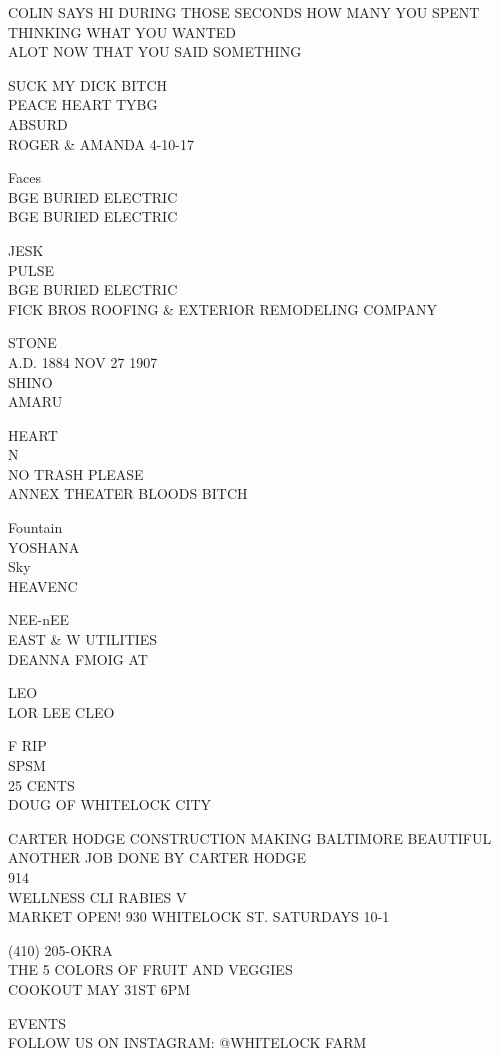 \documentclass[10pt,letterpaper]{article}
\begin{document}
COLIN SAYS HI DURING THOSE SECONDS HOW MANY YOU SPENT THINKING WHAT YOU WANTED\\
ALOT NOW THAT YOU SAID SOMETHING

SUCK MY DICK BITCH\\
PEACE HEART TYBG\\
ABSURD\\
ROGER \& AMANDA 4{-}10{-}17

Faces\\
BGE BURIED ELECTRIC\\
BGE BURIED ELECTRIC

JESK\\
PULSE\\
BGE BURIED ELECTRIC\\
FICK BROS ROOFING \& EXTERIOR REMODELING COMPANY

STONE\\
A.D. 1884 NOV 27 1907\\
SHINO\\
AMARU

HEART\\
N\\
NO TRASH PLEASE\\
ANNEX THEATER BLOODS BITCH

Fountain\\
YOSHANA\\
Sky\\
HEAVENC

NEE{-}nEE\\
EAST \& W UTILITIES\\
DEANNA FMOIG AT

LEO\\
LOR LEE CLEO

F RIP\\
SPSM\\
25 CENTS\\
DOUG OF WHITELOCK CITY

CARTER HODGE CONSTRUCTION MAKING BALTIMORE BEAUTIFUL ANOTHER JOB DONE BY CARTER HODGE\\
914\\
WELLNESS CLI RABIES V\\
MARKET OPEN! 930 WHITELOCK ST. SATURDAYS 10{-}1

(410) 205{-}OKRA\\
THE 5 COLORS OF FRUIT AND VEGGIES\\
COOKOUT MAY 31ST 6PM

EVENTS\\
FOLLOW US ON INSTAGRAM: @WHITELOCK FARM
\end{document}
